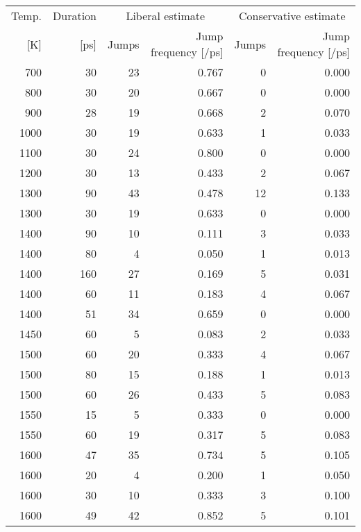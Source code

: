 \documentclass[11pt,bibliography=totoc,index=totoc]{scrbook}   %
\begin{document}
\begin{table}[htbp]
  \centering
  \begin{threeparttable}[htbp]

    \begin{tabular}{rrrrrr}
      \toprule
        Temp.  & Duration & \multicolumn{2}{c}{Liberal estimate}\tnote{a} & \multicolumn{2}{c}{Conservative estimate}\tnote{b} \\
        {[K]} & {[ps]}  & Jumps & Jump frequency [/ps] & Jumps & Jump frequency [/ps] \\
      \midrule
         700 &  30 & 23 & 0.767 &  0 & 0.000 \\
         800 &  30 & 20 & 0.667 &  0 & 0.000 \\
         900 &  28 & 19 & 0.668 &  2 & 0.070 \\
        1000 &  30 & 19 & 0.633 &  1 & 0.033 \\
        1100 &  30 & 24 & 0.800 &  0 & 0.000 \\
        1200 &  30 & 13 & 0.433 &  2 & 0.067 \\
        1300 &  90 & 43 & 0.478 & 12 & 0.133 \\
        1300 &  30 & 19 & 0.633 &  0 & 0.000 \\
        1400 &  90 & 10 & 0.111 &  3 & 0.033 \\
        1400 &  80 &  4 & 0.050 &  1 & 0.013 \\
        1400 & 160\tnote{c} & 27 & 0.169 &  5 & 0.031 \\
        1400 &  60 & 11 & 0.183 &  4 & 0.067 \\
        1400 &  51 & 34 & 0.659 &  0 & 0.000 \\
        1450 &  60 &  5 & 0.083 &  2 & 0.033 \\
        1500 &  60 & 20 & 0.333 &  4 & 0.067 \\
        1500 &  80 & 15 & 0.188 &  1 & 0.013 \\
        1500 &  60 & 26 & 0.433 &  5 & 0.083 \\
        1550 &  15 &  5 & 0.333 &  0 & 0.000 \\
        1550 &  60 & 19 & 0.317 &  5 & 0.083 \\
        1600 &  47 & 35 & 0.734 &  5 & 0.105 \\
        1600 &  20 &  4 & 0.200 &  1 & 0.050 \\
        1600 &  30 & 10 & 0.333 &  3 & 0.100 \\
        1600 &  49 & 42 & 0.852 &  5 & 0.101 \\

\end{tabular}
\end{threeparttable}
\end{table}
\end{document}
